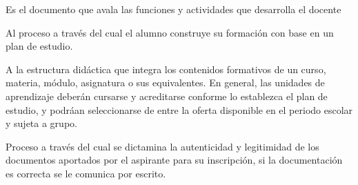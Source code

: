 \begin{bGlosario}
	 Es  el  documento  que  avala  las  funciones  y  actividades  que  desarrolla  el  docente
	
	 Al proceso a través del cual el alumno construye su formación con base en un plan de estudio.
	
	 A la estructura didáctica que integra los contenidos formativos de un curso, materia, módulo, asignatura o sus equivalentes.
	En general, las unidades de aprendizaje deberán cursarse y acreditarse conforme lo establezca el plan de estudio, y podráan seleccionarse de entre
	la oferta disponible en el periodo escolar y sujeta a grupo. %
	
	 Proceso a través del cual se dictamina la autenticidad y legitimidad de los documentos aportados por el aspirante para su inscripción, si la documentación es correcta se le comunica por escrito. %
	
	
	
	
 
\end{bGlosario}



